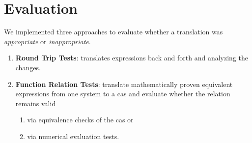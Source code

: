 \section{Evaluation}\label{sec:evaluation}



We implemented three approaches to evaluate whether a translation was \textit{appropriate} or \textit{inappropriate}.
\begin{enumerate}
\item \textbf{Round Trip Tests}: translates expressions back and forth and analyzing the changes.
\item \textbf{Function Relation Tests}: translate mathematically proven equivalent expressions from one system to a \gls*{cas} and evaluate whether the relation remains valid
\begin{enumerate}
\item via equivalence checks of the \gls*{cas} or
\item via numerical evaluation tests.
\end{enumerate}
\end{enumerate}

